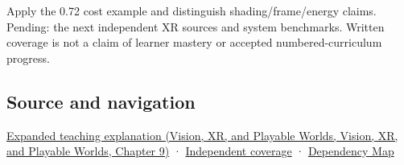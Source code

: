 Apply the 0.72 cost example and distinguish shading/frame/energy claims. Pending: the next independent XR sources and system benchmarks. Written coverage is not a claim of learner mastery or accepted numbered-curriculum progress.

\subsection{Source and navigation}\label{appendix-5878b813b732-source-and-navigation}

\href{../07-Vision-XR-and-Playable-Worlds/main.pdf\#nameddest=04-visual-computing-ii-ch042-foveation-is-allocation-under-uncertain-perception-and-timing}{Expanded teaching explanation (Vision, XR, and Playable Worlds, Vision, XR, and Playable Worlds, Chapter 9)} · \hyperref[appendix-fd090d982a15-xr01---independent-seeing-and-representation-source]{Independent coverage} · \hyperref[appendix-4ad47bdd269a]{Dependency Map}
